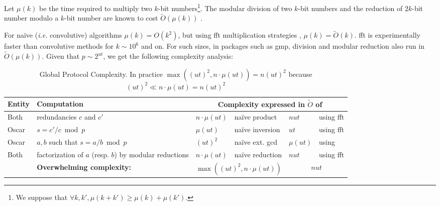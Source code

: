 \documentclass[11pt]{llncs}
\newcommand{\Oapp}{\ensuremath{\tilde{O}}}
\newcommand{\comm}[1]{\marginpar{%
\vskip-\baselineskip %
\raggedright\footnotesize
\itshape\hrule\smallskip#1\par\smallskip\hrule}}
\begin{document}
Let $\mu(k)$ be the time required to multiply two $k$-bit numbers\footnote{We suppose that $\forall k,k', \mu(k+k') \ge \mu(k) + \mu(k')$.}.
The modular division of two $k$-bit numbers and the reduction of $2k$-bit number modulo a $k$-bit number are known to cost $\Oapp(\mu(k))$ \cite{burnikel1998fast}.\smallskip

For na\"{i}ve ({\sl i.e.} convolutive) algorithms $\mu(k) = O(k^2)$, but using {\sc fft} multiplication strategies \cite{schonhage1971schnelle}, $\mu(k) = \Oapp(k)$. {\sc fft} is experimentally faster than convolutive methods for $k \sim 10^6$ and on. For such sizes, in packages such as {\sf gmp}, division and modular reduction also run in $\Oapp(\mu(k))$. Given that $p \sim 2^{ut}$, we get the following complexity analysis:

\comm{"reduction also run in $\Oapp(\mu(k))$"}

\begin{table}
  \begin{tabularx}{\textwidth}{lXp{1.2cm}p{2.3cm}p{1.2cm}p{2.3cm}}\toprule
{\bf \hfill Entity \hfill \null} & {\bf \hfill Computation \hfill \null} &
    \multicolumn{4}{c}{{\bf Complexity expressed in $\Oapp$ of}} \\\midrule
Both  & redundancies $c$ and $c'$                                        & $n \cdot \mu(u t)$  & na\"{i}ve product & $n u t$  & using {\sc fft}             \\
Oscar & $s = c' / c \bmod p$                                             & $\mu(u t)$    & na\"{i}ve inversion& $u t$    & using {\sc fft}               \\
Oscar & $a,b$ such that $s = a / b \bmod p$                              & $(u t)^2$   & na\"{i}ve ext. {\sc gcd} & $\mu(u t)$ &  using \cite{pan2004rational,wang2003acceleration} \\
Both  & factorization of $a$ (resp. $b$) by modular reductions           & $n \cdot \mu(u t)$  & na\"{i}ve reduction & $n u t$  & using {\sc fft}             \\
      & {\bf Overwhelming complexity:}                                   &
    \multicolumn{2}{c}{$\max((u t)^2,n \cdot \mu(ut))$ }    &
    \multicolumn{2}{c}{$n u t$}              \\\bottomrule
  \end{tabularx}
  \caption{Global Protocol Complexity. In practice $\max((u t)^2,n \cdot \mu(ut))=n(u t)^2$ because $(u t)^2 \ll n \cdot \mu(ut)=n(u t)^2$}
  \label{tab:workload}
\end{table}
\end{document}
